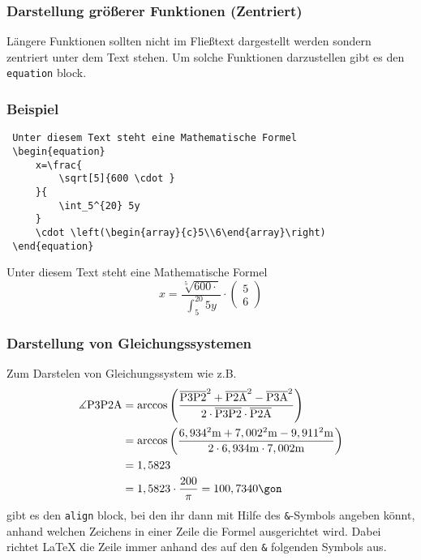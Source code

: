 \subsubsection{Darstellung größerer Funktionen (Zentriert)}
Längere Funktionen sollten nicht im Fließtext dargestellt werden sondern zentriert unter dem Text stehen. Um solche Funktionen darzustellen gibt es den \texttt{equation} block.
\subsubsection*{Beispiel}
\begin{lstlisting}
 Unter diesem Text steht eine Mathematische Formel
 \begin{equation}
     x=\frac{
         \sqrt[5]{600 \cdot }
     }{
         \int_5^{20} 5y
     }
     \cdot \left(\begin{array}{c}5\\6\end{array}\right)
 \end{equation}
\end{lstlisting}
Unter diesem Text steht eine Mathematische Formel
\begin{equation} \label{eq:einfache}
	x=\frac{
	    \sqrt[5]{600 \cdot }
	}{
		\int_5^{20} 5y
	}
	\cdot \left(\begin{array}{c}5\\6\end{array}\right)
\end{equation}

\subsubsection{Darstellung von Gleichungssystemen}
Zum Darstelen von Gleichungssystem wie z.B.
\begin{align}
\measuredangle \text{P3P2A}
	&= \arccos \left(
		\frac{\overline{\text{P3P2}}^2 + \overline{\text{P2A}}^2 - \overline{\text{P3A}}^2}
		     {2 \cdot \overline{\text{P3P2}} \cdot \overline{\text{P2A}}}
		\right) \\
	&= \arccos \left(
		\frac{6,934^2\si{\meter} + 7,002^2\si{\meter} - 9,911^2\si{\meter}}
		     {2 \cdot 6,934\si{\meter} \cdot 7,002\si{\meter}}
		\right) \\
	&= 1,5823 \\
	&= 1,5823 \cdot \frac{200}{\pi} = 100,7340\si{\gon}
\end{align}
gibt es den \texttt{align} block, bei den ihr dann mit Hilfe des \texttt{\&}-Symbols angeben könnt, anhand welchen Zeichens in einer Zeile die Formel ausgerichtet wird. Dabei richtet {\LaTeX} die Zeile immer anhand des auf den \texttt{\&} folgenden Symbols aus.
